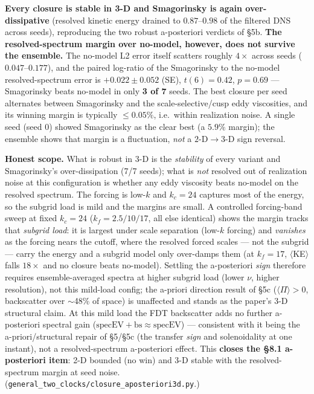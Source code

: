 \documentclass[aps,prfluids,preprint,superscriptaddress,nofootinbib]{revtex4-2}
\newcommand{\code}[1]{\texttt{#1}}
\begin{document}
\textbf{Every closure is stable in 3-D and Smagorinsky is again over-dissipative} (resolved kinetic energy drained to $0.87$--$0.98$ of the filtered DNS across seeds), reproducing the two robust a-posteriori verdicts of §5b. \textbf{The resolved-spectrum margin over no-model, however, does not survive the ensemble.} The no-model L2 error itself scatters roughly $4\times$ across seeds ($0.047$--$0.177$), and the paired log-ratio of the Smagorinsky to the no-model resolved-spectrum error is $+0.022\pm 0.052$ (SE), $t(6)=0.42$, $p=0.69$ --- Smagorinsky beats no-model in only \textbf{3 of 7} seeds. The best closure per seed alternates between Smagorinsky and the scale-selective/cusp eddy viscosities, and its winning margin is typically $\le 0.05\%$, i.e.\ within realization noise. A single seed (seed 0) showed Smagorinsky as the clear best (a $5.9\%$ margin); the ensemble shows that margin is a fluctuation, \emph{not} a $2\text{-D}\!\to\!3\text{-D}$ sign reversal.


\textbf{Honest scope.} What is robust in 3-D is the \emph{stability} of every variant and Smagorinsky's over-dissipation (7/7 seeds); what is \emph{not} resolved out of realization noise at this configuration is whether any eddy viscosity beats no-model on the resolved spectrum. The forcing is low-$k$ and $k_{c}=24$ captures most of the energy, so the subgrid load is mild and the margins are small. A controlled forcing-band sweep at fixed $k_{c}=24$ ($k_{f}=2.5/10/17$, all else identical) shows the margin tracks that \emph{subgrid load}: it is largest under scale separation (low-$k$ forcing) and \emph{vanishes} as the forcing nears the cutoff, where the resolved forced scales --- not the subgrid --- carry the energy and a subgrid model only over-damps them (at $k_{f}=17$, $\langle$KE$\rangle$ falls $18\times$ and no closure beats no-model). Settling the a-posteriori \emph{sign} therefore requires ensemble-averaged spectra at higher subgrid load (lower $\nu$, higher resolution), not this mild-load config; the a-priori direction result of §5c ($\langle \Pi \rangle >0$, backscatter over $\sim $48\% of space) is unaffected and stands as the paper's 3-D structural claim. At this mild load the FDT backscatter adds no further a-posteriori spectral gain ($\mathrm{specEV{+}bs}\approx \mathrm{specEV}$) --- consistent with it being the a-priori/structural repair of §5/§5c (the transfer \emph{sign} and solenoidality at one instant), not a resolved-spectrum a-posteriori effect. This \textbf{closes the §8.1 a-posteriori item}: 2-D bounded (no win) and 3-D stable with the resolved-spectrum margin at seed noise. (\code{general\_\allowbreak{}two\_\allowbreak{}clocks/\allowbreak{}closure\_\allowbreak{}aposteriori3d.\allowbreak{}py}.)
\end{document}
